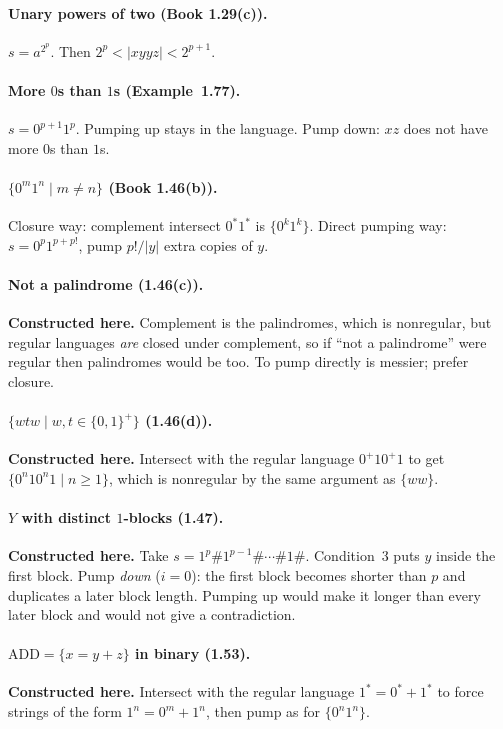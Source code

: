 \documentclass[11pt,a4paper]{article}
\begin{document}
\paragraph{Unary powers of two (Book 1.29(c)).}
$s=a^{2^p}$. Then $2^p<|xyyz|<2^{p+1}$.

\paragraph{More $0$s than $1$s (Example~1.77).}
$s=0^{p+1}1^p$. Pumping up stays in the language. Pump down:
$xz$ does not have more $0$s than $1$s.

\paragraph{$\{0^m1^n\mid m\neq n\}$ (Book 1.46(b)).}
Closure way: complement intersect $0^*1^*$ is $\{0^k1^k\}$. Direct
pumping way: $s=0^p1^{p+p!}$, pump $p!/|y|$ extra copies of $y$.

\paragraph{Not a palindrome (1.46(c)).}
\textbf{Constructed here.} Complement is the palindromes, which is
nonregular, but regular languages \emph{are} closed under complement,
so if ``not a palindrome'' were regular then palindromes would be
too. To pump directly is messier; prefer closure.

\paragraph{$\{wtw\mid w,t\in\{0,1\}^+\}$ (1.46(d)).}
\textbf{Constructed here.} Intersect with the regular language
$0^+10^+1$ to get $\{0^n10^n1\mid n\ge 1\}$, which is nonregular
by the same argument as $\{ww\}$.

\paragraph{$Y$ with distinct $1$-blocks (1.47).}
\textbf{Constructed here.} Take
$s=1^p\#1^{p-1}\#\cdots\#1\#$. Condition~$3$ puts $y$ inside the
first block. Pump \emph{down} ($i=0$): the first block becomes
shorter than $p$ and duplicates a later block length. Pumping up
would make it longer than every later block and would not give a
contradiction.

\paragraph{$\mathrm{ADD}=\{x{=}y{+}z\}$ in binary (1.53).}
\textbf{Constructed here.} Intersect with the regular language
$1^*{=}0^*{+}1^*$ to force strings of the form $1^n{=}0^m{+}1^n$,
then pump as for $\{0^n1^n\}$.
\end{document}
